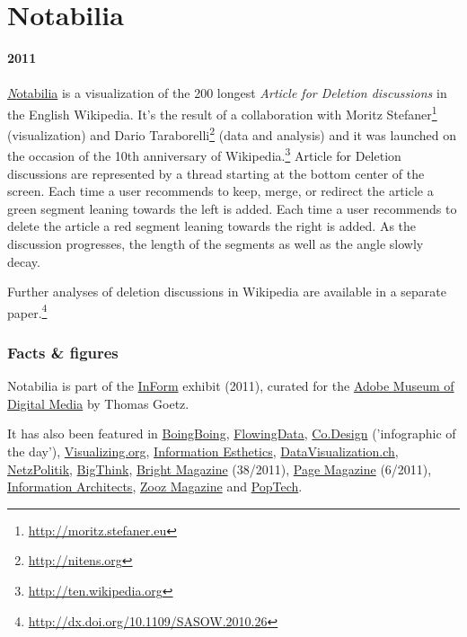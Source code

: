 \documentclass[10pt, a5paper]{article}
\newcommand{\grey}[1]{{\bfseries\addfontfeature{Scale=.85,Color=33333399}{#1}}}
\begin{document}
\begin{minipage}[c]{.6\linewidth} 
\section*{Notabilia}
\textbf{2011}\\
\grey{Flash}\\[.5cm]
\href{http://notabilia.net}{\emph Notabilia} is a visualization of the 200
longest \emph{Article for Deletion discussions} in the English Wikipedia. It's
the result of a collaboration with Moritz
Stefaner\footnote{\url{http://moritz.stefaner.eu}} (visualization) and Dario
Taraborelli\footnote{\url{http://nitens.org}} (data and analysis) and it was
launched on the occasion of the 10th anniversary of
Wikipedia.\footnote{\url{http://ten.wikipedia.org}} Article for Deletion
discussions are represented by a thread starting at the bottom center of the
screen. Each time a user recommends to keep, merge, or redirect the article a
green segment leaning towards the left is added. Each time a user recommends to
delete the article a red segment leaning towards the right is added. As the
discussion progresses, the length of the segments as well as the angle slowly
decay. 

Further analyses of deletion discussions in Wikipedia are available in a
separate paper.\footnote{\url{http://dx.doi.org/10.1109/SASOW.2010.26}}

\subsubsection*{Facts \& figures}
Notabilia is part of the
\href{http://adobemuseum.com/?/exhibit/inform/notabiliaVisualizingDeletionDiscussionsOnWikipedia}{InForm}
exhibit (2011), curated for the \href{http://adobemuseum.com/}{Adobe Museum of
Digital Media} by Thomas Goetz. 

It has also been featured in
\href{http://www.boingboing.net/2011/01/11/visualizing-the-dele.html}{BoingBoing},
\href{http://flowingdata.com/2011/01/11/visualizing-deletion-discussions-on-wikipedia/}{FlowingData},
\href{http://www.fastcodesign.com/1663011/infographic-of-the-day-the-fiery-debates-to-delete-a-wikipedia-entry}{Co.Design}
('infographic of the day'),
\href{http://www.visualizing.org/stories/visualizing-wikipedia}{Visualizing.org},
\href{http://infosthetics.com/archives/2011/01/notabilia_revealing_the_discussions_on_the_deletion_of_wikipedia_articles.html}{Information
Esthetics},
\href{http://datavisualization.ch/showcases/notabilia-–-visualizing-deletion-discussions-on-wikipedia}{DataVisualization.ch},
\href{http://www.netzpolitik.org/2011/schone-visualisierung-der-wikipedia-loschdebatten/}{NetzPolitik},
\href{http://bigthink.com/idea_feed_items/4384}{BigThink},
\href{http://www.bright.nl/bright-38}{Bright Magazine} (38/2011),
\href{http://www.page-online.de/heft/einzelheft/2011/6}{Page Magazine} (6/2011),
\href{http://twitter.com/#!/iA/status/40791557435039744}{Information
Architects}, \href{http://zoozmag.com/zooz/Home_en.html}{Zooz Magazine} and
\href{http://poptech.org/blog/truth__beauty_with_information_visualizer_moritz_stefaner}{PopTech}.
\end{minipage}
\end{document}
